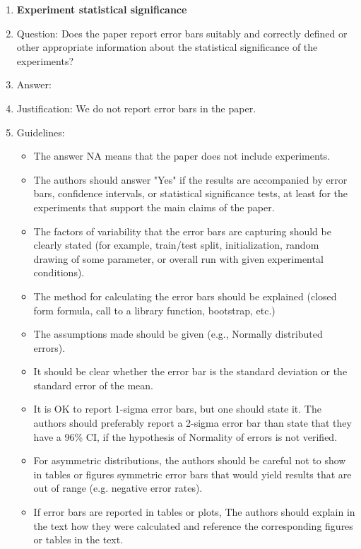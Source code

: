 \documentclass{article}
\theoremstyle{remark}
\begin{document}
\begin{enumerate}
\item {\bf Experiment statistical significance}
    \item[] Question: Does the paper report error bars suitably and correctly defined or other appropriate information about the statistical significance of the experiments?
    \item[] Answer: \answerNo{} %
    \item[] Justification: We do not report error bars in the paper.
    \item[] Guidelines:
    \begin{itemize}
        \item The answer NA means that the paper does not include experiments.
        \item The authors should answer "Yes" if the results are accompanied by error bars, confidence intervals, or statistical significance tests, at least for the experiments that support the main claims of the paper.
        \item The factors of variability that the error bars are capturing should be clearly stated (for example, train/test split, initialization, random drawing of some parameter, or overall run with given experimental conditions).
        \item The method for calculating the error bars should be explained (closed form formula, call to a library function, bootstrap, etc.)
        \item The assumptions made should be given (e.g., Normally distributed errors).
        \item It should be clear whether the error bar is the standard deviation or the standard error of the mean.
        \item It is OK to report 1-sigma error bars, but one should state it. The authors should preferably report a 2-sigma error bar than state that they have a 96\% CI, if the hypothesis of Normality of errors is not verified.
        \item For asymmetric distributions, the authors should be careful not to show in tables or figures symmetric error bars that would yield results that are out of range (e.g. negative error rates).
        \item If error bars are reported in tables or plots, The authors should explain in the text how they were calculated and reference the corresponding figures or tables in the text.
    \end{itemize}


\end{enumerate}
\end{document}
